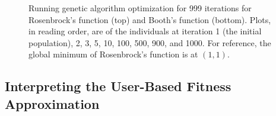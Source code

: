 \documentclass[conference]{IEEEtran}
\begin{document}
\begin{figure}[htbp]
    \caption{Running genetic algorithm optimization for 999 iterations for Rosenbrock's
        function (top) and Booth's function (bottom). Plots, in reading order, are of the individuals at iteration 1 (the initial
        population), 2, 3, 5, 10, 100, 500, 900, and 1000. For reference, the global minimum of Rosenbrock's function is at $(1, 1)$.}
    \label{test}
\end{figure}

\subsection{Interpreting the User-Based Fitness Approximation}
\end{document}
